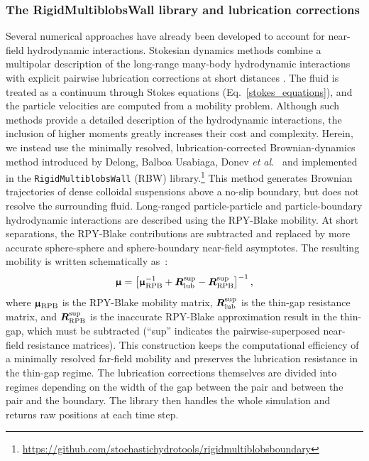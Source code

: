 \subsubsection{The RigidMultiblobsWall library and lubrication corrections}
Several numerical approaches have already been developed to account for near-field hydrodynamic interactions. Stokesian dynamics methods combine a multipolar description of the long-range many-body hydrodynamic interactions with explicit pairwise lubrication corrections at short distances \cite{BradyBossis1988,SwanBrady2007}. The fluid is treated as a continuum through Stokes equations (Eq.~\ref{stokes_equations}), and the particle velocities are computed from a mobility problem. Although such methods provide a detailed description of the hydrodynamic interactions, the inclusion of higher moments greatly increases their cost and complexity. Herein, we instead use the minimally resolved, lubrication-corrected Brownian-dynamics method introduced by Delong, Balboa Usabiaga, Donev \emph{et al.}~\cite{Delong2015} and implemented in the \texttt{RigidMultiblobsWall} (RBW) library.\footnote{\url{https://github.com/stochastichydrotools/rigidmultiblobsboundary}} This method generates Brownian trajectories of dense colloidal suspensions above a no-slip boundary, but does not resolve the surrounding fluid. Long-ranged particle-particle and particle-boundary hydrodynamic interactions are described using the RPY-Blake mobility. At short separations, the RPY-Blake contributions are subtracted and replaced by more accurate sphere-sphere and sphere-boundary near-field asymptotes. The resulting mobility is written schematically as~\cite{sprinkle_driven_2020}:
\begin{equation}
{\bm{\upmu}} =
\left[\bm{\upmu}_{\mathrm{RPB}}^{-1}+\bm{R}_{\mathrm{lub}}^{\mathrm{sup}}-
{\bm{R}}_{\mathrm{RPB}}^{\mathrm{sup}}\right]^{-1},
\end{equation}
where $\bm{\upmu}_{\mathrm{RPB}}$ is the RPY-Blake mobility matrix, $\bm{R}_{\mathrm{lub}}^{\mathrm{sup}}$ is the thin-gap resistance matrix, and ${\bm{R}}_{\mathrm{RPB}}^{\mathrm{sup}}$ is the inaccurate RPY-Blake approximation result in the thin-gap, which must be subtracted (``sup'' indicates the pairwise-superposed near-field resistance matrices). This construction keeps the computational efficiency of a minimally resolved far-field mobility and preserves the lubrication resistance in the thin-gap regime. The lubrication corrections themselves are divided into regimes depending on the width of the gap between the pair and between the pair and the boundary. The library then handles the whole simulation and returns raw positions at each time step. 

